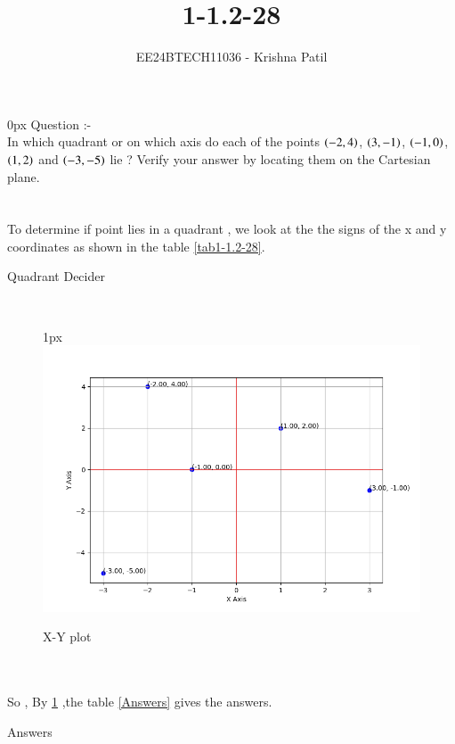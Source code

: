 \documentclass[journal]{IEEEtran}
\begin{document}

\vspace{3cm}

\title{1-1.2-28}
\author{EE24BTECH11036 - Krishna Patil}
{\let\newpage\relax\maketitle}

\renewcommand{\thefigure}{\theenumi}
\renewcommand{\thetable}{\theenumi}
\setlength{\intextsep}{10pt} %


\renewcommand{\thetable}{\theenumi}
\parindent 0px 
{Question :-} \\ 
 In which quadrant or on which axis do each of the points {$ \left(-2,4 \right)$}, {$ \left(3,-1\right) $}, {$ \left(-1,0\right) $}, {$ \left(1,2\right) $} and {$ \left(-3,-5\right) $} lie ? Verify your answer by locating them on the Cartesian plane. \\ \\
\solution \\
To determine if point lies in a quadrant , we look at the the signs of the x and y coordinates as shown in the table \ref{tab1-1.2-28}. \\
\begin{table}[h!]    
  \centering
  
  \caption{Quadrant Decider}
  \label{tab1-1.2-28}
\end{table} \\
\begin{figure}[h!]
   \parindent 1px
	\centering
	\includegraphics[width=0.5\linewidth]{figs/Figure_1.png}
   \caption{X-Y plot}
   \label{x-yplot}
\end{figure} \\ \\ 
\newpage
So , By \ref{x-yplot} ,the table \ref{Answers} gives the answers.
\begin{table}[h!]    
  \centering
  
  \caption{Answers}
  \label{Answers}
\end{table}
\end{document}

